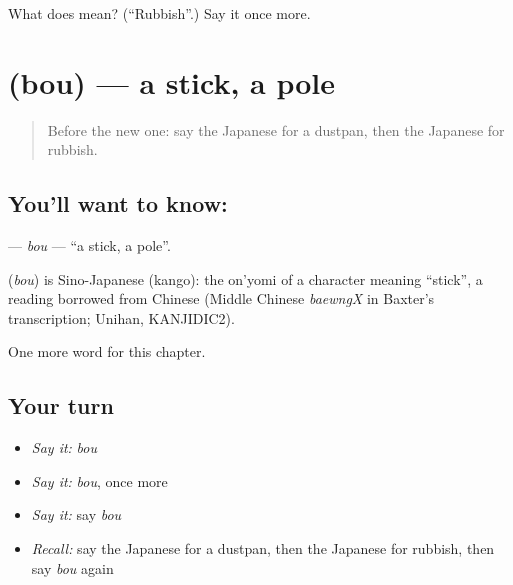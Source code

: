 \begin{tcolorbox}[breakable,colback=teal!4,colframe=teal!35!black,title={Before you move on}]
What does  mean? (\textquotedblleft{}Rubbish\textquotedblright{}.) Say it once more.
\end{tcolorbox}
\section[\texorpdfstring{\ja{ぼう} (bou)}{ぼう (bou)}]{ (bou) — a stick, a pole}

\label{lesson:JA-C100-bou}



\begin{quote}
Before the new one: say the Japanese for a dustpan, then the Japanese for rubbish.
\end{quote}

\subsection*{You'll want to know: }
\textbf{} — \emph{bou} — \textquotedblleft{}a stick, a pole\textquotedblright{}.

\begin{cousinweb}
\textbf{} (\emph{bou}) is Sino-Japanese (kango): the on'yomi of a character meaning \textquotedblleft{}stick\textquotedblright{}, a reading borrowed from Chinese (Middle Chinese \emph{baewngX} in Baxter's transcription; Unihan, KANJIDIC2).
\end{cousinweb}

\begin{grammarlens}[title={What you've built}]
One more word for this chapter.
\end{grammarlens}

\subsection*{Your turn}
\begin{itemize}
\raggedright
  \item \emph{Say it:} \emph{bou}
  \item \emph{Say it:} \emph{bou}, once more
  \item \emph{Say it:} say \emph{bou}
  \item \emph{Recall:} say the Japanese for a dustpan, then the Japanese for rubbish, then say \emph{bou} again
\end{itemize}

